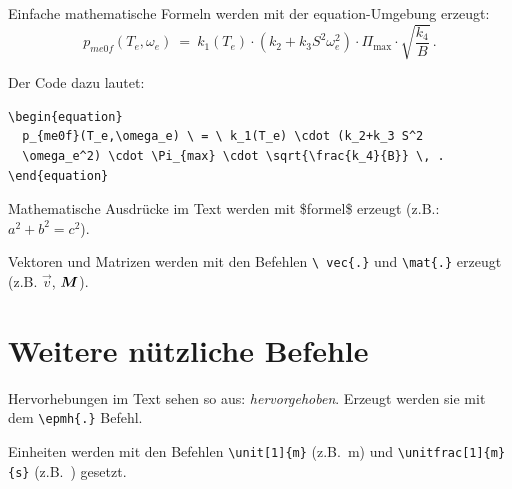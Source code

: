 Einfache mathematische Formeln werden mit der equation-Umgebung
erzeugt:
\begin{equation}
  p_{me0f}(T_e,\omega_e) \ = \ k_1(T_e) \cdot (k_2+k_3 S^2
  \omega_e^2) \cdot \Pi_{\mathrm{max}} \cdot \sqrt{\frac{k_4}{B}} \, .
  \label{eq:my_equation}
\end{equation}

Der Code dazu lautet:
\begin{verbatim}
\begin{equation}
  p_{me0f}(T_e,\omega_e) \ = \ k_1(T_e) \cdot (k_2+k_3 S^2
  \omega_e^2) \cdot \Pi_{max} \cdot \sqrt{\frac{k_4}{B}} \, .
\end{equation}
\end{verbatim}

Mathematische Ausdrücke im Text werden mit \$formel\$ erzeugt (z.B.:
$a^2+b^2=c^2$).

Vektoren und Matrizen werden mit den Befehlen \texttt{\textbackslash
  vec\{.\}} und \texttt{\textbackslash mat\{.\}} erzeugt
(z.B. $\vec{v}$, $\mat{M}$).


\section{Weitere nützliche Befehle}\label{sec:div}

Hervorhebungen im Text sehen so aus: \emph{hervorgehoben}. Erzeugt
werden sie mit dem \texttt{\textbackslash epmh\{.\}} Befehl.

Einheiten werden mit den Befehlen \texttt{\textbackslash unit[1]\{m\}}
(z.B.~\unit[1]{m}) und \texttt{\textbackslash unitfrac[1]\{m\}\{s\}}
(z.B.~) gesetzt.

